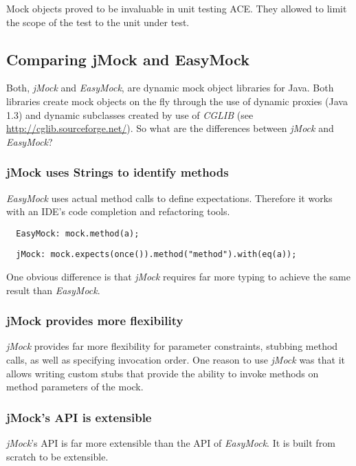 Mock objects proved to be invaluable in unit testing ACE. They allowed to
limit the scope of the test to the unit under test.


\subsection{Comparing jMock and EasyMock}
Both, \emph{jMock} and \emph{EasyMock}, are dynamic mock object libraries 
for Java. Both libraries
create mock objects on the fly through the use of dynamic proxies (Java 1.3)
and dynamic subclasses created by use of \emph{CGLIB} 
(see \href{http://cglib.sourceforge.net/}{http://cglib.sourceforge.net/}). 
So what are the differences between \emph{jMock} and \emph{EasyMock}?

\subsubsection{jMock uses Strings to identify methods}
\emph{EasyMock} uses actual method calls to define expectations. 
Therefore it works with an IDE's code completion and refactoring tools.

\small{\begin{verbatim}
  EasyMock: mock.method(a);
\end{verbatim}}

\small{\begin{verbatim}
  jMock: mock.expects(once()).method("method").with(eq(a));
\end{verbatim}}

One obvious difference is that \emph{jMock} requires far more typing to
achieve the same result than \emph{EasyMock}.

\subsubsection{jMock provides more flexibility}
\emph{jMock} provides far more flexibility for parameter constraints, stubbing
method calls, as well as specifying invocation order. One reason to use
\emph{jMock} was that it allows writing custom stubs that provide the ability
to invoke methods on method parameters of the mock.

\subsubsection{jMock's API is extensible}
\emph{jMock}'s API is far more extensible than the API of \emph{EasyMock}. 
It is built from scratch to be extensible.

